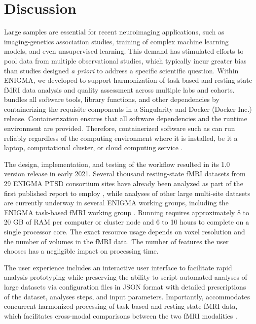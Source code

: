 \section{Discussion}

Large samples are essential for recent neuroimaging applications, such as imaging-genetics association studies, training of complex machine learning models, and even unsupervised learning. This demand has stimulated efforts to pool data from multiple observational studies, which typically incur greater bias than studies designed \emph{a priori} to address a specific scientific question. Within ENIGMA, we developed  to support harmonization of task-based and resting-state fMRI data analysis and quality assessment across multiple labs and cohorts.  bundles all software tools, library functions, and other dependencies by containerizing the requisite components in a Singularity \parencite{kurtzer2017} and Docker (Docker Inc.) release. Containerization ensures that all software dependencies and the runtime environment are provided. Therefore, containerized software such as  can run reliably regardless of the computing environment where it is installed, be it a laptop, computational cluster, or cloud computing service \parencite{gruning2018}.

The design, implementation, and testing of the  workflow resulted in its 1.0 version release in early 2021. Several thousand resting-state fMRI datasets from 29 ENIGMA PTSD consortium sites have already been analyzed as part of the first published report to employ  \parencite{weis2020b}, while analyses of other large multi-site datasets are currently underway in several ENIGMA working groups, including the ENIGMA task-based fMRI working group \parencite{veer2019b}. Running  requires approximately 8 to 20 GB of RAM per computer or cluster node and 6 to 10 hours to complete on a single processor core. The exact resource usage depends on voxel resolution and the number of volumes in the fMRI data. The number of features the user chooses has a negligible impact on processing time.

The  user experience includes an interactive user interface to facilitate rapid analysis prototyping while preserving the ability to script automated analyses of large datasets via configuration files in JSON format with detailed prescriptions of the dataset, analyses steps, and input parameters. Importantly,  accommodates concurrent harmonized processing of task-based and resting-state fMRI data, which facilitates cross-modal comparisons between the two fMRI modalities \parencite[e.g.,][]{kerestes2017}.

